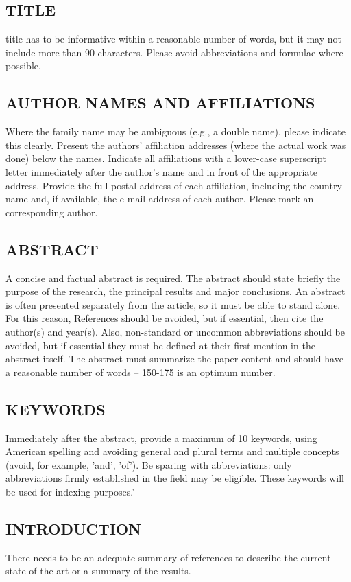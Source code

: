 \documentclass{ieeeijc}
\begin{document}
\subsection{TITLE}

 title has to be informative within a reasonable number of words, but it may not include more than 90 characters. Please avoid abbreviations and formulae where possible.

\subsection{AUTHOR NAMES AND AFFILIATIONS}
Where the family name may be ambiguous (e.g., a double name), please indicate this clearly. Present the authors' affiliation addresses (where the actual work was done) below the names. Indicate all affiliations with a lower-case superscript letter immediately after the author's name and in front of the appropriate address. Provide the full postal address of each affiliation, including the country name and, if available, the e-mail address of each author. Please mark an corresponding author.

\subsection{ABSTRACT}
A concise and factual abstract is required. The abstract should state briefly the purpose of the research, the principal results and major conclusions. An abstract is often presented separately from the article, so it must be able to stand alone. For this reason, References should be avoided, but if essential, then cite the author(s) and year(s). Also, non-standard or uncommon abbreviations should be avoided, but if essential they must be defined at their first mention in the abstract itself. The abstract must summarize the paper content and should have a reasonable number of words – 150-175 is an optimum number.

\subsection{KEYWORDS}
Immediately after the abstract, provide a maximum of 10 keywords, using American spelling and avoiding general and plural terms and multiple concepts (avoid, for example, 'and', 'of'). Be sparing with abbreviations: only abbreviations firmly established in the field may be eligible. These keywords will be used for indexing purposes.'

\subsection{INTRODUCTION}
There needs to be an adequate summary of references to describe the current state-of-the-art or a summary of the results.
\end{document}
